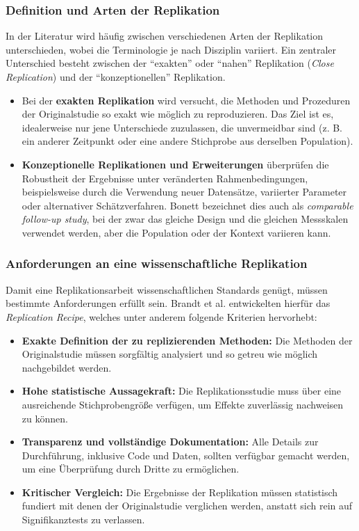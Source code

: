 \subsubsection{Definition und Arten der Replikation}

In der Literatur wird häufig zwischen verschiedenen Arten der Replikation unterschieden, wobei die Terminologie je nach Disziplin variiert. Ein zentraler Unterschied besteht zwischen der \enquote{exakten} oder \enquote{nahen} Replikation (\textit{Close Replication}) und der \enquote{konzeptionellen} Replikation.

\begin{itemize}
  \item Bei der \textbf{exakten Replikation} wird versucht, die Methoden und Prozeduren der Originalstudie so exakt wie möglich zu reproduzieren. Das Ziel ist es, idealerweise nur jene Unterschiede zuzulassen, die unvermeidbar sind (z. B. ein anderer Zeitpunkt oder eine andere Stichprobe aus derselben Population).
  \item \textbf{Konzeptionelle Replikationen und Erweiterungen} überprüfen die Robustheit der Ergebnisse unter veränderten Rahmenbedingungen, beispielsweise durch die Verwendung neuer Datensätze, variierter Parameter oder alternativer Schätzverfahren. Bonett \cite{bonett-2020} bezeichnet dies auch als \textit{comparable follow-up study}, bei der zwar das gleiche Design und die gleichen Messskalen verwendet werden, aber die Population oder der Kontext variieren kann.
\end{itemize}



\subsubsection{Anforderungen an eine wissenschaftliche Replikation}

Damit eine Replikationsarbeit wissenschaftlichen Standards genügt, müssen bestimmte Anforderungen erfüllt sein. Brandt et al. \cite{brandt-2013} entwickelten hierfür das \textit{Replication Recipe}, welches unter anderem folgende Kriterien hervorhebt:

\begin{itemize}
  \item \textbf{Exakte Definition der zu replizierenden Methoden:} Die Methoden der Originalstudie müssen sorgfältig analysiert und so getreu wie möglich nachgebildet werden.
  \item \textbf{Hohe statistische Aussagekraft:} Die Replikationsstudie muss über eine ausreichende Stichprobengröße verfügen, um Effekte zuverlässig nachweisen zu können.
  \item \textbf{Transparenz und vollständige Dokumentation:} Alle Details zur Durchführung, inklusive Code und Daten, sollten verfügbar gemacht werden, um eine Überprüfung durch Dritte zu ermöglichen.
  \item \textbf{Kritischer Vergleich:} Die Ergebnisse der Replikation müssen statistisch fundiert mit denen der Originalstudie verglichen werden, anstatt sich rein auf Signifikanztests zu verlassen.
\end{itemize}


